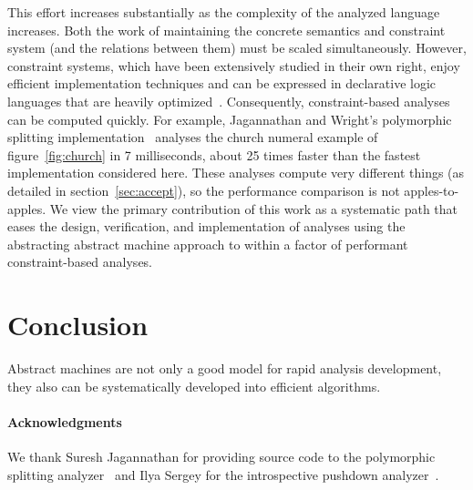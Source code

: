 \documentclass[preprint,onecolumn,9pt]{sigplanconf} %
\begin{document}
This effort increases substantially as the complexity of the analyzed
language increases.  Both the work of maintaining the concrete
semantics and constraint system (and the relations between them) must
be scaled simultaneously.  However, constraint systems, which have
been extensively studied in their own right, enjoy efficient
implementation techniques and can be expressed in declarative logic
languages that are heavily
optimized~\cite{dvanhorn:bravenboer-smaragdakis-oopsla09}.
Consequently, constraint-based analyses can be computed quickly.  For
example, Jagannathan and Wright's polymorphic splitting
implementation~\cite{dvanhorn:wright-jagannathan-toplas98} analyses
the church numeral example of figure~\ref{fig:church} in 7
milliseconds, about 25 times faster than the fastest implementation
considered here.  These analyses compute very different things (as
detailed in section~\ref{sec:accept}), so the performance comparison
is not apples-to-apples.  We view the primary contribution of this
work as a systematic path that eases the design, verification, and
implementation of analyses using the abstracting abstract machine
approach to within a factor of performant constraint-based analyses.

\section{Conclusion}
\label{sec:conclusion}

Abstract machines are not only a good model for rapid analysis
development, they also can be systematically developed into efficient
algorithms.




\paragraph{Acknowledgments}

We thank Suresh Jagannathan for providing source code to the
polymorphic splitting
analyzer~\cite{dvanhorn:wright-jagannathan-toplas98} and Ilya Sergey
for the introspective pushdown
analyzer~\cite{dvanhorn:Earl2012Introspective}.

\balance



% 
\end{document}
